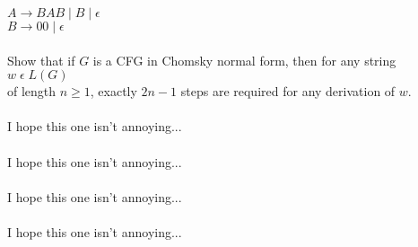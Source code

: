 \documentclass[12pt]{article}
\begin{document}
\noindent
$A \rightarrow BAB \; | \; B \; | \; \epsilon $ \\
$B \rightarrow 00 \; | \; \epsilon $ \\

 \\
Show that if $G$ is a CFG in Chomsky normal form, then for any string $w \; \epsilon \; L(G)$ \\
of length $n \geq 1$, exactly $2n - 1$ steps are required 
for any derivation of $w$. \\

 \\

I hope this one isn't annoying... \\

 \\

I hope this one isn't annoying... \\

 \\

I hope this one isn't annoying... \\

 \\

I hope this one isn't annoying... \\
\end{document}
